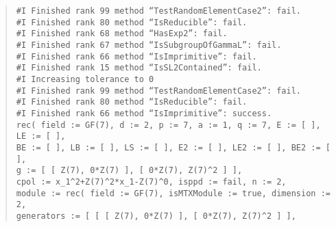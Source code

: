 \documentclass[a4paper,11pt]{article}
\theoremstyle{bla}
\begin{document}
\begin{quote}
\hspace*{-1cm} \texttt{\#I  Finished rank 99 method ``TestRandomElementCase2'': fail.}\\
\hspace*{-1cm} \texttt{\#I  Finished rank 80 method ``IsReducible'': fail.}\\
\hspace*{-1cm} \texttt{\#I  Finished rank 68 method ``HasExp2'': fail.}\\
\hspace*{-1cm} \texttt{\#I  Finished rank 67 method ``IsSubgroupOfGammaL'': fail.}\\
\hspace*{-1cm} \texttt{\#I  Finished rank 66 method ``IsImprimitive'': fail.}\\
\hspace*{-1cm} \texttt{\#I  Finished rank 15 method ``IsSL2Contained'': fail.}\\
\hspace*{-1cm} \texttt{\#I  Increasing tolerance to 0}\\
\hspace*{-1cm} \texttt{\#I  Finished rank 99 method ``TestRandomElementCase2'': fail.}\\
\hspace*{-1cm} \texttt{\#I  Finished rank 80 method ``IsReducible'': fail.}\\
\hspace*{-1cm} \texttt{\#I  Finished rank 66 method ``IsImprimitive'': success.}\\
\hspace*{-1cm} \texttt{rec( field := GF(7), d := 2, p := 7, a := 1, q := 7, E := [  ], LE := [  ],}\\
  \hspace*{-1cm} \texttt{BE := [  ], LB := [  ], LS := [  ], E2 := [  ], LE2 := [  ], BE2 := [  ],}\\
  \hspace*{-1cm} \texttt{g := [ [ Z(7), 0*Z(7) ], [ 0*Z(7), Z(7)\^{}2 ] ],}\\
  \hspace*{-1cm} \texttt{cpol := x\_1\^{}2+Z(7)\^{}2*x\_1-Z(7)\^{}0, isppd := fail, n := 2,}\\
  \hspace*{-1cm} \texttt{module := rec( field := GF(7), isMTXModule := true, dimension := 2,}\\
      \hspace*{-1cm} \texttt{generators := [ [ [ Z(7), 0*Z(7) ], [ 0*Z(7), Z(7)\^{}2 ] ],}\\

\end{quote}
\end{document}
